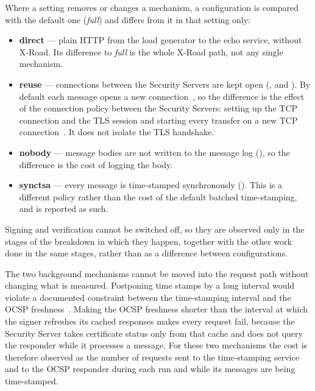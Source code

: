 \documentclass[conference,a4paper]{IEEEtran}
\begin{document}
Where a setting removes or changes a mechanism, a configuration is compared with the default one
(\emph{full}) and differs from it in that setting only:

\begin{itemize}
  \item \textbf{direct} --- plain HTTP from the load generator to the echo service, without X-Road.
  Its difference to \emph{full} is the whole X-Road path, not any single mechanism.
  \item {\sloppy \textbf{reuse} --- connections between the Security Servers are kept open
  (,  and
  ). By default each message opens a new
  connection~\cite{xroadsyspar}, so the difference is the effect of the connection policy between
  the Security Servers: setting up the TCP connection and the TLS session and starting every
  transfer on a new TCP connection~\cite{naylor2014}. It does not isolate the TLS handshake.\par}
  \item \textbf{nobody} --- message bodies are not written to the message log
  (), so the difference is the cost of logging the body.
  \item \textbf{synctsa} --- every message is time-stamped synchronously
  (). This is a different policy rather than the cost of the
  default batched time-stamping, and is reported as such.
\end{itemize}

Signing and verification cannot be switched off, so they are observed only in the stages of the
breakdown in which they happen, together with the other work done in the same stages, rather than as
a difference between configurations.

The two background mechanisms cannot be moved into the request path without changing what is
measured. Postponing time stamps by a long interval would violate a documented constraint between the
time-stamping interval and the OCSP freshness~\cite{xroadsyspar}. Making the OCSP freshness shorter
than the interval at which the signer refreshes its cached responses makes every request fail,
because the Security Server takes certificate status only from that cache and does not query the
responder while it processes a message. For these two mechanisms the cost is therefore observed as the number of requests
sent to the time-stamping service and to the OCSP responder during each run and while its messages
are being time-stamped.
\end{document}
